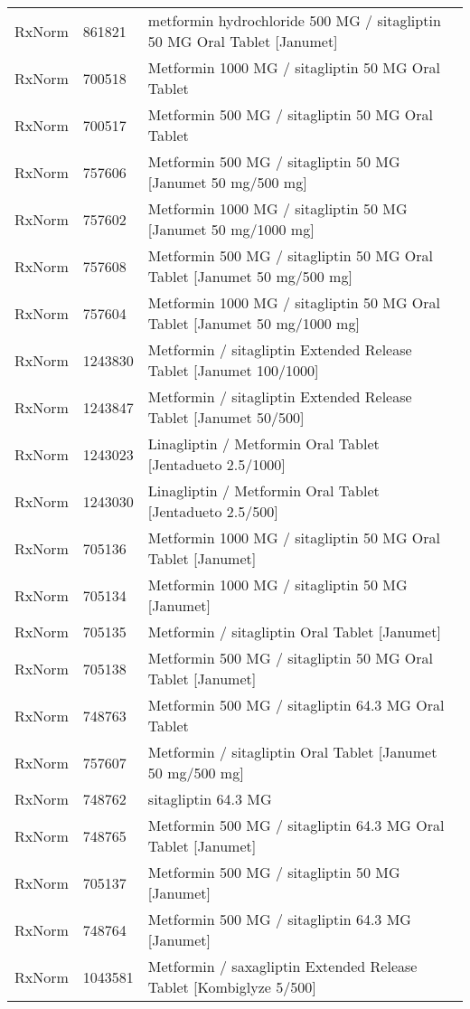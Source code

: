 \begin{longtable}{p{}p{}p{}}
  RxNorm & 861821 & metformin hydrochloride 500 MG / sitagliptin 50 MG Oral Tablet [Janumet] \\ 
  RxNorm & 700518 & Metformin 1000 MG / sitagliptin 50 MG Oral Tablet \\ 
  RxNorm & 700517 & Metformin 500 MG / sitagliptin 50 MG Oral Tablet \\ 
  RxNorm & 757606 & Metformin 500 MG / sitagliptin 50 MG [Janumet 50 mg/500 mg] \\ 
  RxNorm & 757602 & Metformin 1000 MG / sitagliptin 50 MG [Janumet 50 mg/1000 mg] \\ 
  RxNorm & 757608 & Metformin 500 MG / sitagliptin 50 MG Oral Tablet [Janumet 50 mg/500 mg] \\ 
  RxNorm & 757604 & Metformin 1000 MG / sitagliptin 50 MG Oral Tablet [Janumet 50 mg/1000 mg] \\ 
  RxNorm & 1243830 & Metformin / sitagliptin Extended Release Tablet [Janumet 100/1000] \\ 
  RxNorm & 1243847 & Metformin / sitagliptin Extended Release Tablet [Janumet 50/500] \\ 
  RxNorm & 1243023 & Linagliptin / Metformin Oral Tablet [Jentadueto 2.5/1000] \\ 
  RxNorm & 1243030 & Linagliptin / Metformin Oral Tablet [Jentadueto 2.5/500] \\ 
  RxNorm & 705136 & Metformin 1000 MG / sitagliptin 50 MG Oral Tablet [Janumet] \\ 
  RxNorm & 705134 & Metformin 1000 MG / sitagliptin 50 MG [Janumet] \\ 
  RxNorm & 705135 & Metformin / sitagliptin Oral Tablet [Janumet] \\ 
  RxNorm & 705138 & Metformin 500 MG / sitagliptin 50 MG Oral Tablet [Janumet] \\ 
  RxNorm & 748763 & Metformin 500 MG / sitagliptin 64.3 MG Oral Tablet \\ 
  RxNorm & 757607 & Metformin / sitagliptin Oral Tablet [Janumet 50 mg/500 mg] \\ 
  RxNorm & 748762 & sitagliptin 64.3 MG \\ 
  RxNorm & 748765 & Metformin 500 MG / sitagliptin 64.3 MG Oral Tablet [Janumet] \\ 
  RxNorm & 705137 & Metformin 500 MG / sitagliptin 50 MG [Janumet] \\ 
  RxNorm & 748764 & Metformin 500 MG / sitagliptin 64.3 MG [Janumet] \\ 
  RxNorm & 1043581 & Metformin / saxagliptin Extended Release Tablet [Kombiglyze 5/500] \\ 

\end{longtable}
